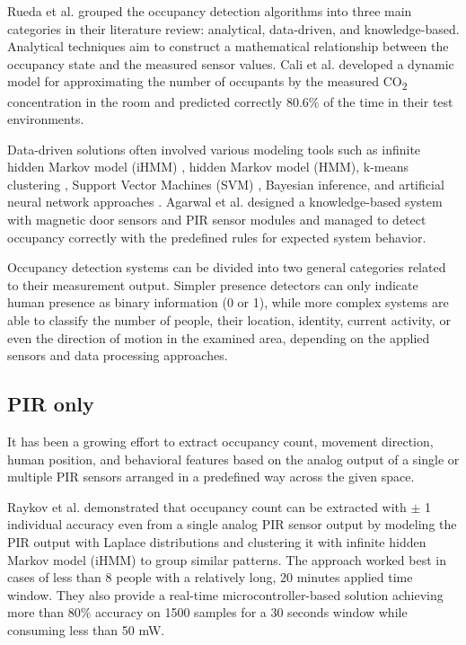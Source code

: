 \begin{sloppypar}
Rueda et al. \cite{build_occ_det_tech_review} grouped the occupancy detection algorithms into three main categories in their literature review: analytical, data-driven, and knowledge-based. Analytical techniques aim to construct a mathematical relationship between the occupancy state and the measured sensor values. Cali et al. \cite{CALI2015co2_anal} developed a dynamic model for approximating the number of occupants by the measured CO\textsubscript{2} concentration in the room and predicted correctly 80.6\% of the time in their test environments.
\end{sloppypar}

Data-driven solutions often involved various modeling tools such as infinite hidden Markov model (iHMM) \cite{rasmussen1999infiniteGM}, hidden Markov model (HMM), k-means clustering \cite{hartigan1979kmeansclus, likas2003globalkmeansclus}, Support Vector Machines (SVM) \cite{noble2006supportVM}, Bayesian inference, and artificial neural network approaches \cite{Yang12multisensor_aud, UCI_nn_real_time}. Agarwal et al. \cite{rajesh10occ_rules} designed a knowledge-based system with magnetic door sensors and PIR sensor modules and managed to detect occupancy correctly with the predefined rules for expected system behavior.

Occupancy detection systems can be divided into two general categories related to their measurement output. Simpler presence detectors can only indicate human presence as binary information (0 or 1), while more complex systems are able to classify the number of people, their location, identity, current activity, or even the direction of motion in the examined area, depending on the applied sensors and data processing approaches.



\subsection{PIR only}
It has been a growing effort to extract occupancy count, movement direction, human position, and behavioral features based on the analog output of a single or multiple PIR sensors arranged in a predefined way across the given space. 

Raykov et al. \cite{PIR_only_behav_ext} demonstrated that occupancy count can be extracted with $\pm$ 1 individual accuracy even from a single analog PIR sensor output by modeling the PIR output with Laplace distributions and clustering it with infinite hidden Markov model (iHMM) to group similar patterns. The approach worked best in cases of less than 8 people with a relatively long, 20 minutes applied time window.
They also provide a real-time microcontroller-based solution \cite{PIR_only_behav_ext_mcu} achieving more than 80\% accuracy on 1500 samples for a 30 seconds window while consuming less than 50 mW.


